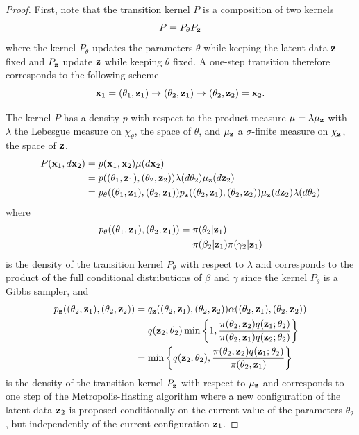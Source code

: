 \documentclass[11pt]{article}
\begin{document}
	\begin{proof}
		First, note that the transition kernel $P$ is a composition of two kernels
		$$ P = P_{\theta} P_{\mathbf{z}}$$
		where the kernel $ P_{\theta}$ updates the parameters $\theta$ while keeping the latent data $\mathbf{z}$ fixed and $P_{\mathbf{z}}$ update $\mathbf{z}$ while keeping $\theta$ fixed. A one-step transition therefore corresponds to the following scheme 
		$$\mathbf{x}_1 = (\theta_1, \mathbf{z}_1) \rightarrow (\theta_2, \mathbf{z}_1) \rightarrow (\theta_2, \mathbf{z}_2) = \mathbf{x}_2.$$
		
		The kernel $P$ has a density $p$ with respect to the product measure $\mu = \lambda \mu_{\mathbf{z}}$ with $\lambda$ the Lebesgue measure on $\chi_{\theta}$, the space of $\theta$, and $\mu_{\mathbf{z}}$ a $\sigma$-finite measure on $\chi_{\mathbf{z}}$, the space of $\mathbf{z}$.
		\begin{align*}
			P(\mathbf{x}_1, d\mathbf{x}_2) 
			& = p(\mathbf{x}_1, \mathbf{x}_2) \mu(d\mathbf{x}_2) \\
			& = p((\theta_1, \mathbf{z}_1), (\theta_2, \mathbf{z}_2)) \lambda(d\theta_2)\mu_{\mathbf{z}}(d\mathbf{z}_2) \\
			& = p_{\theta}((\theta_1, \mathbf{z}_1), (\theta_2, \mathbf{z}_1)) p_{\mathbf{z}}((\theta_2, \mathbf{z}_1), (\theta_2, \mathbf{z}_2)) \mu_{\mathbf{z}}(d\mathbf{z}_2) \lambda(d\theta_2)
		\end{align*}
		where
		\begin{align*}
			p_{\theta}((\theta_1, \mathbf{z}_1), (\theta_2, \mathbf{z}_1))
			& = \pi(\theta_2| \mathbf{z}_1) \\
			& = \pi(\beta_2|\mathbf{z}_1) \pi(\gamma_2|\mathbf{z}_1)
		\end{align*}
		is the density of the transition kernel $P_{\theta}$ with respect to $\lambda$ and corresponds to the product of the full conditional distributions of $\beta$ and $\gamma$ since the kernel $P_{\theta}$ is a Gibbs sampler, and
		\begin{align*}
			p_{\mathbf{z}}((\theta_2, \mathbf{z}_1), (\theta_2, \mathbf{z}_2))
			& = q_{\mathbf{z}}((\theta_2, \mathbf{z}_1), (\theta_2, \mathbf{z}_2)) \alpha((\theta_2, \mathbf{z}_1), (\theta_2, \mathbf{z}_2)) \\
			& = q(\mathbf{z}_2; \theta_2) \min\left\lbrace 1, \dfrac{\pi(\theta_2, \mathbf{z}_2)q(\mathbf{z}_1; \theta_2)}{\pi(\theta_2, \mathbf{z}_1)q(\mathbf{z}_2; \theta_2)} \right\rbrace \\
			& = \min\left\lbrace q(\mathbf{z}_2; \theta_2), \dfrac{\pi(\theta_2, \mathbf{z}_2)q(\mathbf{z}_1; \theta_2)}{\pi(\theta_2, \mathbf{z}_1)} \right\rbrace
		\end{align*}
		is the density of the transition kernel $P_{\mathbf{z}}$ with respect to $\mu_{\mathbf{z}}$ and corresponds to one step of the Metropolis-Hasting algorithm where a new configuration of the latent data $\mathbf{z}_2$ is proposed conditionally on the current value of the parameters $\theta_2$, but independently of the current configuration $\mathbf{z}_1$.
		

\end{proof}
\end{document}
